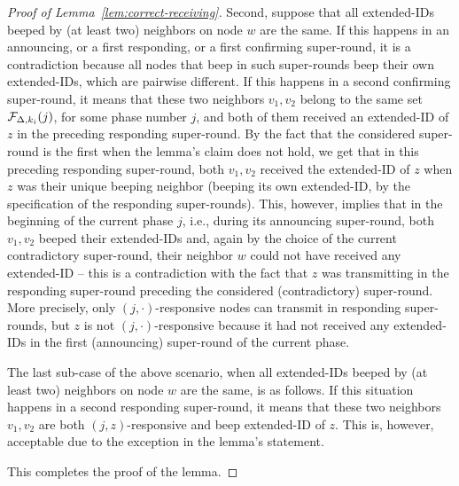 \begin{proof}[Proof of Lemma~\ref{lem:correct-receiving}]
Second, suppose that all extended-IDs beeped by (at least two) neighbors on node $w$ are the same. If this happens in an announcing, or a first responding, or a first confirming super-round, it is a contradiction because all nodes that beep in such super-rounds beep their own extended-IDs, which are pairwise different.
%
If this happens in a second confirming super-round, it means that these two neighbors $v_1,v_2$ belong to the same set $\mathcal{F}_{\Delta,k_i}(j)$, for some phase number $j$, and both of them received an extended-ID of $z$ in the preceding responding super-round. By the fact that the considered super-round is the first when the lemma's claim does not hold, we get that in this preceding responding super-round, both $v_1,v_2$ received the extended-ID of $z$ when $z$ was their unique beeping neighbor (beeping its own extended-ID, by the specification of the responding super-rounds).
This, however, implies that in the beginning of the current phase $j$, i.e., during its announcing super-round, both $v_1,v_2$ beeped their extended-IDs and, again by the choice of the current contradictory super-round, their neighbor $w$ could not have received any extended-ID -- this is a contradiction with the fact that $z$ was transmitting in the responding super-round preceding the considered (contradictory) super-round. More precisely, only $(j,\cdot)$-responsive nodes can transmit in responding super-rounds, but $z$ is not $(j,\cdot)$-responsive because it had not received any extended-IDs in the first (announcing) super-round of the current phase.

The last sub-case of the above scenario, when all extended-IDs beeped by (at least two) neighbors on node $w$ are the same, is as follows. 
If this situation happens in a second responding super-round, it means 
that these two neighbors $v_1,v_2$ are both $(j,z)$-responsive and beep extended-ID of $z$. This is, however, acceptable due to the exception in the lemma's statement.

This completes the proof of the lemma.
\end{proof}


